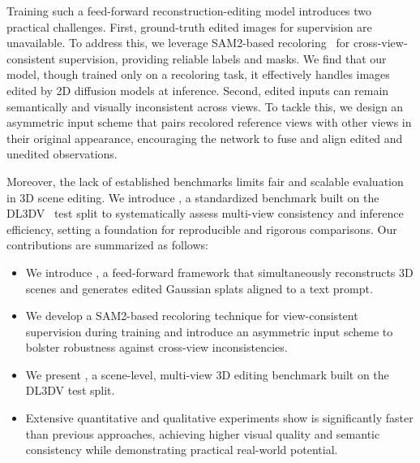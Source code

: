 Training such a feed-forward reconstruction-editing model introduces two practical challenges. First, ground-truth edited images for supervision are unavailable. To address this, we leverage SAM2-based recoloring~\cite{ravi2024sam} for cross-view-consistent supervision, providing reliable labels and masks. We find that our model, though trained only on a recoloring task, it effectively handles images edited by 2D diffusion models at inference. Second, edited inputs can remain semantically and visually inconsistent across views. To tackle this, we design an asymmetric input scheme that pairs recolored reference views with other views in their original appearance, encouraging the network to fuse and align edited and unedited observations.

Moreover, the lack of established benchmarks limits fair and scalable evaluation in 3D scene editing. We introduce {\ourbench}, a standardized benchmark built on the DL3DV~\cite{ling2023dl3dv10klargescalescenedataset} test split to systematically assess multi-view consistency and inference efficiency, setting a foundation for reproducible and rigorous comparisons.
%
Our contributions are summarized as follows:
\begin{itemize}
\item We introduce {\ourmethod}, a feed-forward framework that simultaneously reconstructs 3D scenes and generates edited Gaussian splats aligned to a text prompt.
\item We develop a SAM2-based recoloring technique for view-consistent supervision during training and introduce an asymmetric input scheme to bolster robustness against cross-view inconsistencies.
\item We present {\ourbench}, a scene-level, multi-view 3D editing benchmark built on the DL3DV test split.
\item Extensive quantitative and qualitative experiments show {\ourmethod} is significantly faster than previous approaches, achieving higher visual quality and semantic consistency while demonstrating practical real-world potential.
\end{itemize}




